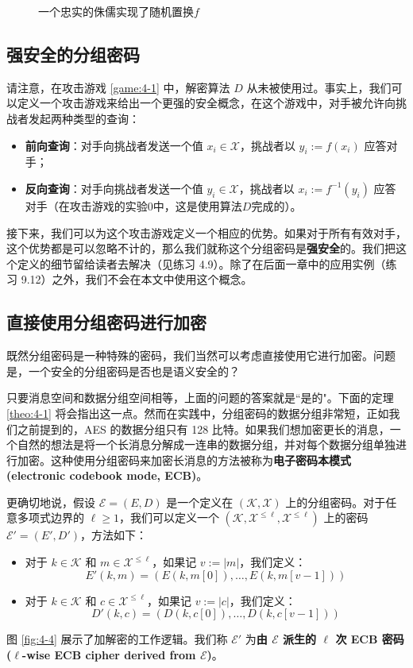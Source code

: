 \begin{figure}
  \centering
  
  \caption{一个忠实的侏儒实现了随机置换$f$}
  \label{fig:4-3}
\end{figure}

\subsection{强安全的分组密码}\label{subsec:4-1-3}

请注意，在攻击游戏 \ref{game:4-1} 中，解密算法 $D$ 从未被使用过。事实上，我们可以定义一个攻击游戏来给出一个更强的安全概念，在这个游戏中，对手被允许向挑战者发起两种类型的查询：
\begin{itemize}
	\item \textbf{前向查询}：对手向挑战者发送一个值 $x_i\in\mathcal{X}$，挑战者以 $y_i:=f(x_i)$ 应答对手；
	\item \textbf{反向查询}：对手向挑战者发送一个值 $y_i\in\mathcal{X}$，挑战者以 $x_i:=f^{-1}(y_i)$ 应答对手（在攻击游戏的实验$0$中，这是使用算法$D$完成的）。
\end{itemize}
接下来，我们可以为这个攻击游戏定义一个相应的优势。如果对于所有有效对手，这个优势都是可以忽略不计的，那么我们就称这个分组密码是\textbf{强安全}的。我们把这个定义的细节留给读者去解决（见练习 4.9）。除了在后面一章中的应用实例（练习 9.12）之外，我们不会在本文中使用这个概念。

\subsection{直接使用分组密码进行加密}\label{subsec:4-1-4}

既然分组密码是一种特殊的密码，我们当然可以考虑直接使用它进行加密。问题是，一个安全的分组密码是否也是语义安全的？

只要消息空间和数据分组空间相等，上面的问题的答案就是``是的"。下面的定理 \ref{theo:4-1} 将会指出这一点。然而在实践中，分组密码的数据分组非常短，正如我们之前提到的，AES 的数据分组只有 128 比特。如果我们想加密更长的消息，一个自然的想法是将一个长消息分解成一连串的数据分组，并对每个数据分组单独进行加密。这种使用分组密码来加密长消息的方法被称为\textbf{电子密码本模式 (electronic codebook mode, ECB)}。

更确切地说，假设 $\mathcal{E}=(E,D)$ 是一个定义在 $(\mathcal{K},\mathcal{X})$ 上的分组密码。对于任意多项式边界的 $\ell\geq1$，我们可以定义一个 $(\mathcal{K},\mathcal{X}^{\leq\ell},\mathcal{X}^{\leq\ell})$ 上的密码 $\mathcal{E}'=(E',D')$，方法如下：
\begin{itemize}
	\item 对于 $k\in\mathcal{K}$ 和 $m\in\mathcal{X}^{\leq\ell}$，如果记 $v:=|m|$，我们定义：
	\[
    E'(k,m)=(E(k,m[0]),\dots,E(k,m[v-1]))
    \]
	\item 对于 $k\in\mathcal{K}$ 和 $c\in\mathcal{X}^{\leq\ell}$，如果记 $v:=|c|$，我们定义：
	\[
	D'(k,c)=(D(k,c[0]),\dots,D(k,c[v-1]))
	\]
\end{itemize}
图 \ref{fig:4-4} 展示了加解密的工作逻辑。我们称 $\mathcal{E}'$ 为\textbf{由 $\mathcal{E}$ 派生的 $\ell$ 次 ECB 密码 ($\ell$-wise ECB cipher derived from $\mathcal{E}$)}。

